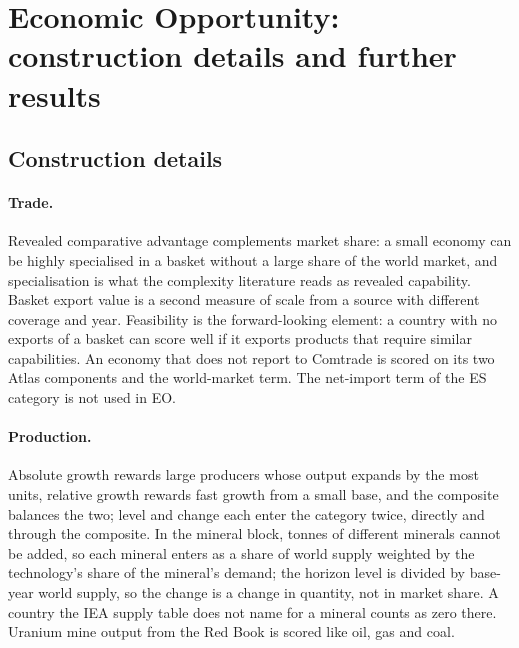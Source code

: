 \section{Economic Opportunity: construction details and further results}\label{oa:eo}

\subsection{Construction details}

\paragraph{Trade.} Revealed comparative advantage complements market share: a small economy can be
highly specialised in a basket without a large share of the world market, and specialisation is
what the complexity literature reads as revealed capability. Basket export value is a second
measure of scale from a source with different coverage and year. Feasibility is the forward-looking
element: a country with no exports of a basket can score well if it exports products that require
similar capabilities. An economy that does not report to Comtrade is scored on its two Atlas
components and the world-market term. The net-import term of the ES category is not used in EO.

\paragraph{Production.} Absolute growth rewards large producers whose output expands by the most
units, relative growth rewards fast growth from a small base, and the composite balances the two;
level and change each enter the category twice, directly and through the composite. In the mineral
block, tonnes of different minerals cannot be added, so each mineral enters as a share of world
supply weighted by the technology's share of the mineral's demand; the horizon level is divided by
base-year world supply, so the change is a change in quantity, not in market share. A country the
IEA supply table does not name for a mineral counts as zero there. Uranium mine output from the Red
Book is scored like oil, gas and coal.

